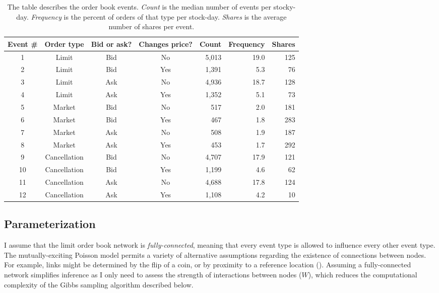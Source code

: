 		\begin{table}[t]
			\small
			\linespread{1}
			\centering
			\begin{tabular*}{\textwidth}{@{\extracolsep{\fill}}ccccrrr}
			\toprule
			Event \# & Order type & Bid or ask? & Changes price? & Count & Frequency & Shares \\
			\midrule
			1 & Limit & Bid & No & 5,013 & 19.0 & 125 \\
			2 & Limit & Bid & Yes & 1,391 & 5.3 & 76 \\
			3 & Limit & Ask & No & 4,936 & 18.7 & 128 \\
			4 & Limit & Ask & Yes & 1,352 & 5.1 & 73 \\  %
			5 & Market & Bid & No & 517 & 2.0 & 181 \\   %
			6 & Market & Bid & Yes & 467 & 1.8 & 283 \\  %
			7 & Market & Ask & No & 508 & 1.9 & 187 \\   %
			8 & Market & Ask & Yes & 453 & 1.7 & 292 \\
			9 & Cancellation & Bid & No & 4,707 & 17.9 & 121 \\
			10 & Cancellation & Bid & Yes & 1,199 & 4.6 & 62 \\
			11 & Cancellation & Ask & No & 4,688 & 17.8 & 124 \\
			12 & Cancellation & Ask & Yes & 1,108 & 4.2 & 10 \\
			\bottomrule
			\end{tabular*}
			\captionsetup{position=below, font=footnotesize, justification=justified, width=\linewidth}
			\caption[Order book event definitions]{The table describes the order book events. \textit{Count} is the median number of events per stocky-day. \textit{Frequency} is the percent of orders of that type per stock-day. \textit{Shares} is the average number of shares per event.}
			\label{tab:event_definitions}
		\end{table}

	\subsection{Parameterization}
		I assume that the limit order book network is \textit{fully-connected}, meaning that every event type is allowed to influence every other event type. The mutually-exciting Poisson model permits a variety of alternative assumptions regarding the existence of connections between nodes. For example, links might be determined by the flip of a coin, or by proximity to a reference location (\cite{Linderman2015}). Assuming a fully-connected network simplifies inference as I only need to assess the strength of interactions between nodes ($W$), which reduces the computational complexity of the Gibbs sampling algorithm described below.

